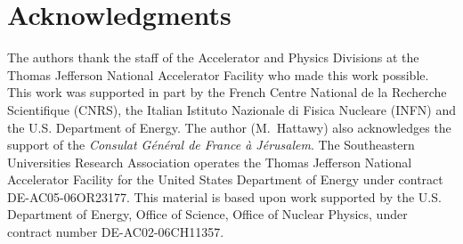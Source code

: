 \section{Acknowledgments}

The authors thank the staff of the Accelerator and Physics Divisions at the 
Thomas Jefferson National Accelerator Facility who made this work possible.  
This work was supported in part by the French Centre National de la Recherche 
Scientifique (CNRS), the Italian Istituto Nazionale di Fisica Nucleare (INFN) 
and the U.S. Department of Energy. The author (M.~Hattawy) also acknowledges 
the support of the {\it Consulat G\'en\'eral de France \`a J\'erusalem}.  The 
Southeastern Universities Research Association operates the Thomas Jefferson 
National Accelerator Facility for the United States Department of Energy under 
contract DE-AC05-06OR23177. This material is based upon work supported by the 
U.S. Department of Energy, Office of Science, Office of Nuclear Physics, under 
contract number DE-AC02-06CH11357.
